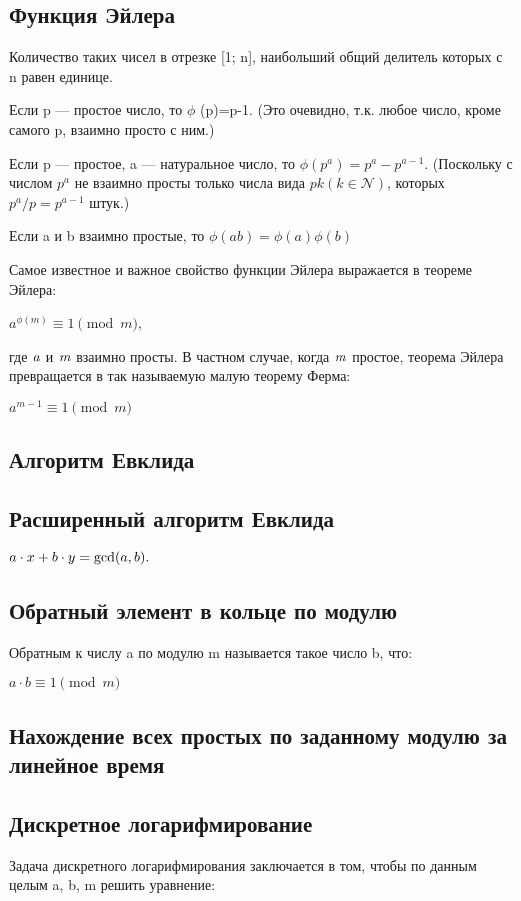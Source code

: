 \documentclass[a4paper]{article}
\begin{document}
\begin{multicols*}{2}
		\subsection{Функция Эйлера}
		Количество таких чисел в отрезке [1; n], наибольший общий делитель которых с n равен единице.
		
		Если p — простое число, то $\phi$ (p)=p-1.
		(Это очевидно, т.к. любое число, кроме самого p, взаимно просто с ним.)
		
		Если p — простое, a — натуральное число, то $\phi (p^a)=p^a-p^{a-1}$.
		(Поскольку с числом $p^a$ не взаимно просты только числа вида $pk (k \in \mathcal{N})$, которых $p^a / p = p^{a-1}$ штук.)
		
		Если a и b взаимно простые, то $\phi(ab) = \phi(a) \phi(b) $
		
		Самое известное и важное свойство функции Эйлера выражается в теореме Эйлера:
		
		$a^{\phi(m)} \equiv 1 \pmod m$, 
		
		где $\it a$ и $\it m$ взаимно просты.
		В частном случае, когда $\it m$ простое, теорема Эйлера превращается в так называемую малую теорему Ферма:
		
		$a^{m-1} \equiv 1  \pmod m $
		
		\subsection{Алгоритм Евклида}
		
		\subsection{Расширенный алгоритм Евклида}
		$a \cdot x + b \cdot y = {\rm gcd} (a, b).$
		
		\subsection{Обратный элемент в кольце по модулю}
		Обратным к числу a по модулю m называется такое число b, что:
		
		$a \cdot b \equiv 1 \pmod m$
		
		\subsection{Нахождение всех простых по заданному модулю за линейное время}
		
		\subsection{Дискретное логарифмирование}
		Задача дискретного логарифмирования заключается в том, чтобы по данным целым a, b, m решить уравнение:
		

\end{multicols*}
\end{document}
